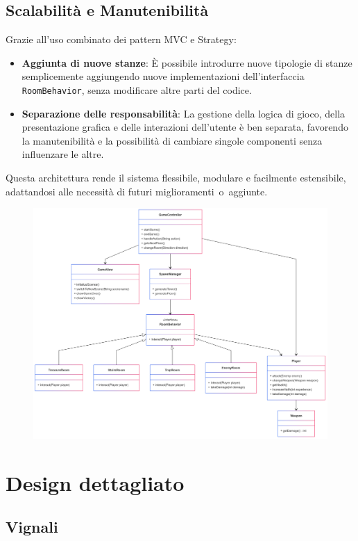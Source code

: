 \documentclass[a4paper,12pt]{report}
\begin{document}
\subsection*{Scalabilità e Manutenibilità}
Grazie all'uso combinato dei pattern MVC e Strategy:
\begin{itemize}
    \item \textbf{Aggiunta di nuove stanze}: È possibile introdurre nuove tipologie di stanze semplicemente aggiungendo nuove implementazioni dell'interfaccia \texttt{RoomBehavior}, senza modificare altre parti del codice.
    \item \textbf{Separazione delle responsabilità}: La gestione della logica di gioco, della presentazione grafica e delle interazioni dell'utente è ben separata, favorendo la manutenibilità e la possibilità di cambiare singole componenti senza influenzare le altre.
\end{itemize}

Questa architettura rende il sistema flessibile, modulare e facilmente estensibile, adattandosi alle necessità di futuri miglioramenti o aggiunte.
%
\begin{figure}[H]
	\includegraphics[scale=0.12]{img/design.png}
\end{figure}

\section{Design dettagliato}
\subsection{Vignali}
\end{document}
